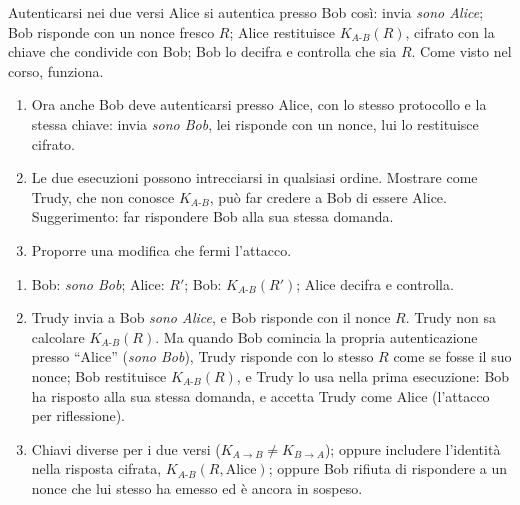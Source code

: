 \begin{esercizio}{Autenticarsi nei due versi}
Alice si autentica presso Bob così: invia \emph{sono Alice}; Bob risponde con un nonce fresco $R$; Alice restituisce $K_{A\text{-}B}(R)$,
cifrato con la chiave che condivide con Bob; Bob lo decifra e controlla che sia $R$. Come visto nel corso, funziona.
\begin{enumerate}[label=(\alph*)]
    \item Ora anche Bob deve autenticarsi presso Alice, con lo stesso protocollo e la stessa chiave: invia \emph{sono Bob}, lei risponde con
          un nonce, lui lo restituisce cifrato.
    \item Le due esecuzioni possono intrecciarsi in qualsiasi ordine. Mostrare come Trudy, che non conosce $K_{A\text{-}B}$, può far credere a
          Bob di essere Alice. Suggerimento: far rispondere Bob alla sua stessa domanda.
    \item Proporre una modifica che fermi l'attacco.
\end{enumerate}

\svolgimento
\begin{enumerate}[label=(\alph*)]
    \item Bob: \emph{sono Bob}; Alice: $R'$; Bob: $K_{A\text{-}B}(R')$; Alice decifra e controlla.
    \item Trudy invia a Bob \emph{sono Alice}, e Bob risponde con il nonce $R$. Trudy non sa calcolare $K_{A\text{-}B}(R)$. Ma quando Bob
          comincia la propria autenticazione presso ``Alice'' (\emph{sono Bob}), Trudy risponde con lo stesso $R$ come se fosse il suo nonce;
          Bob restituisce $K_{A\text{-}B}(R)$, e Trudy lo usa nella prima esecuzione: Bob ha risposto alla sua stessa domanda, e accetta Trudy
          come Alice (l'attacco per riflessione).
    \item Chiavi diverse per i due versi ($K_{A \rightarrow B} \neq K_{B \rightarrow A}$); oppure includere l'identità nella risposta cifrata,
          $K_{A\text{-}B}(R, \text{Alice})$; oppure Bob rifiuta di rispondere a un nonce che lui stesso ha emesso ed è ancora in sospeso.
\end{enumerate}
\end{esercizio}

